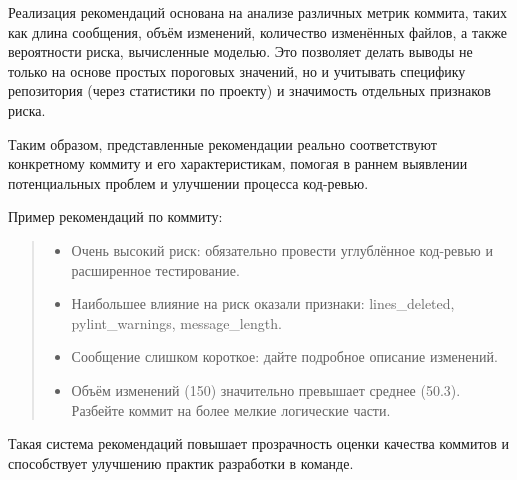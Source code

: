 Реализация рекомендаций основана на анализе различных метрик коммита, таких как длина сообщения, объём изменений, количество изменённых файлов, а также вероятности риска, вычисленные моделью. Это позволяет делать выводы не только на основе простых пороговых значений, но и учитывать специфику репозитория (через статистики по проекту) и значимость отдельных признаков риска.

Таким образом, представленные рекомендации реально соответствуют конкретному коммиту и его характеристикам, помогая в раннем выявлении потенциальных проблем и улучшении процесса код-ревью.

\vspace{0.5em}
Пример рекомендаций по коммиту:

\begin{quote}
	\begin{itemize}
		\item Очень высокий риск: обязательно провести углублённое код-ревью и расширенное тестирование.
		\item  Наибольшее влияние на риск оказали признаки: lines\_deleted, pylint\_warnings, message\_length.
		\item  Сообщение слишком короткое: дайте подробное описание изменений.
		\item Объём изменений (150) значительно превышает среднее (50.3). Разбейте коммит на более мелкие логические части.
	\end{itemize}
\end{quote}

Такая система рекомендаций повышает прозрачность оценки качества коммитов и способствует улучшению практик разработки в команде.

